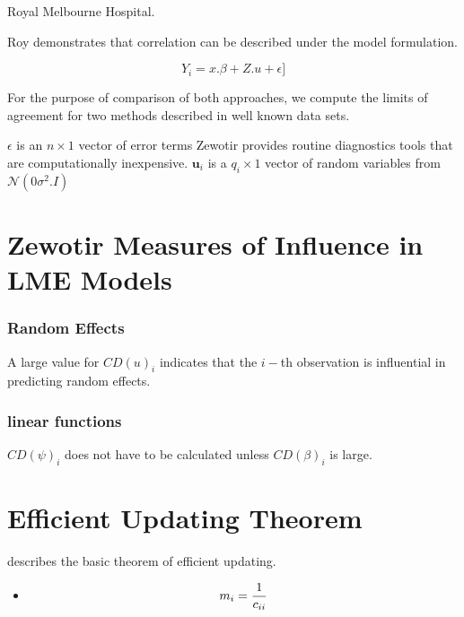 \documentclass[12pt, a4paper]{article}
\begin{document}
Royal Melbourne Hospital.


Roy demonstrates that correlation can be described under the model formulation.

\[Y_i = x.\beta + Z.u + \epsilon]\]




For the purpose of comparison of both approaches, we compute the limits of agreement for two methods described in 
well known data sets.


$\epsilon$ is an $n \times 1$ vector of error terms
Zewotir provides routine diagnostics tools that are computationally inexpensive.
$\boldsymbol{u}_i$ is a $q_i \times 1$  vector of random variables from $\mathcal{N}(0 \sigma^2.I)$







\section{Zewotir Measures of Influence in LME Models}%


\subsubsection{Random Effects}

A large value for $CD(u)_i$ indicates that the $i-$th observation is influential in predicting random effects.

\subsubsection{linear functions}

$CD(\psi)_i$ does not have to be calculated unless $CD(\beta)_i$ is large.





\section{Efficient Updating Theorem} %
\citet{Zewotir} describes the basic theorem of efficient updating.
\begin{itemize}
	\item \[ m_i = {1 \over c_{ii}}\]
\end{itemize}
\end{document}

